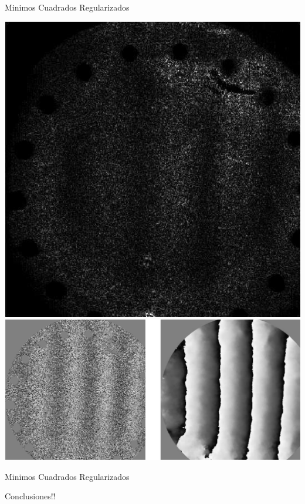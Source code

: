 \documentclass[]{beamer}
\begin{document}
\begin{frame}{Minimos Cuadrados Regularizados}
\begin{center}

\includegraphics[scale=0.3]{Images/InterferogramLS-exp.png}\\
\includegraphics[scale=0.3]{Images/LS-Regularized-exp.png}

\end{center}
\end{frame}
\begin{frame}{Minimos Cuadrados Regularizados}
\begin{center}

Conclusiones!!

\end{center}
\end{frame}
\end{document}
